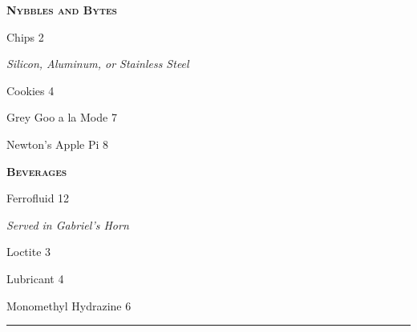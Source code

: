 \documentclass[11pt]{article}
\begin{document}
\begin{center}

\vspace{0.5cm}

\begin{minipage}{8cm}
\begin{center}
\textsc{\textbf{Nybbles and Bytes}}
\end{center}
Chips \hfill 2 \vspace{0.01cm}

{\fontsize{3mm}{11pt}\selectfont\textit{\:Silicon, Aluminum, or Stainless Steel}} \vspace{0.1cm}

Cookies \hfill 4 \vspace{0.1cm}

Grey Goo a la Mode \hfill 7 \vspace{0.1cm}

Newton's Apple Pi \hfill 8 \vspace{0.01cm}
\end{minipage}
\hfill
\begin{minipage}{8cm}
\begin{center}
\textsc{\textbf{Beverages}}
\end{center}
Ferrofluid \hfill 12 \vspace{0.01cm}

{\fontsize{3mm}{11pt}\selectfont\textit{\:Served in Gabriel's Horn}} \vspace{0.1cm}

Loctite \hfill 3 \vspace{0.1cm}

Lubricant \hfill 4 \vspace{0.1cm}

Monomethyl Hydrazine \hfill 6 \vspace{0.01cm}
\end{minipage}
\end{center}

\begin{center}
\rule{\textwidth}{0.5pt}
\end{center}
\end{document}
